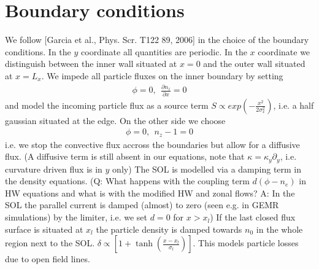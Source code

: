 \documentclass[a4paper,12pt]{scrartcl}
\begin{document}
\section{Boundary conditions}
We follow [Garcia et al., Phys. Scr. T122 89, 2006] in the choice of 
the boundary conditions. 
In the $y$ coordinate all quantities are periodic. 
In the $x$ coordinate we distinguish between the inner wall situated at $x=0$ and
the outer wall situated at $x=L_x$.
We impede all particle fluxes on the inner boundary by setting
\begin{align}
    \phi = 0, \ \ \frac{\partial n_z}{\partial x} = 0
    \label{}
\end{align} 
and model the incoming particle flux as a source term $S\propto exp\left( -\frac{x^2}{2\sigma_x^2} \right)$, i.e. a half gaussian situated at the edge. 
On the other side we choose
\begin{align}
    \phi = 0, \ \ n_z-1=0
    \label{}
\end{align}
i.e. we stop the convective flux accross the boundaries but allow for a diffusive
flux. (A diffusive term is still absent in our equations, note 
that $\kappa = \kappa_y\partial_y$, i.e. curvature driven flux is in $y$ only)
The SOL is modelled via a damping term in the density equations. (Q: What happens
with the coupling term $d(\phi-n_e)$ in HW equations and what is 
with the modified HW and zonal flows?
A: In the SOL the parallel current is damped (almost) to zero (seen e.g. in GEMR 
simulations) by the limiter, i.e. we set $d=0$ for $x>x_l$) 
If the last closed flux surface is situated
at $x_l$ the particle density is damped towards $n_0$ in the whole region
next to the SOL. $\delta \propto [1+\tanh(\frac{x-x_l}{\sigma_l})]$. This
models particle losses due to open field lines.
\end{document}
